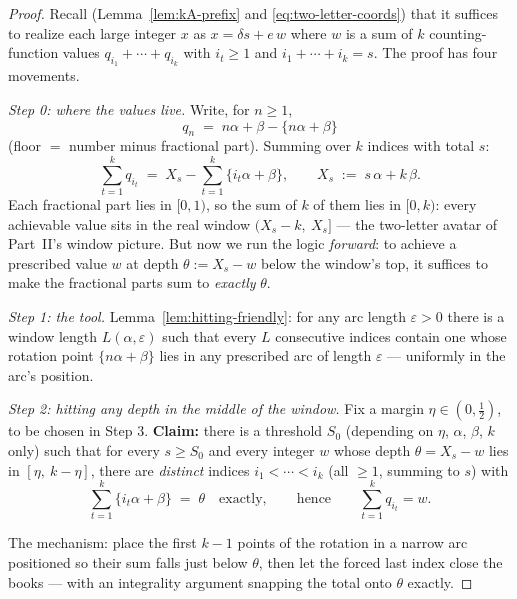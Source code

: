 \documentclass[11pt,reqno]{amsart}
\theoremstyle{plain}
\theoremstyle{definition}
\theoremstyle{remark}
\begin{document}
\begin{proof}
Recall (Lemma~\ref{lem:kA-prefix} and \eqref{eq:two-letter-coords}) that it
suffices to realize each large integer $x$ as $x = \delta s + e\,w$ where $w$ is a
sum of $k$ counting-function values $q_{i_1} + \cdots + q_{i_k}$ with $i_t \ge 1$
and $i_1 + \cdots + i_k = s$. The proof has four movements.

\smallskip
\emph{Step 0: where the values live.} Write, for $n \ge 1$,
\[
  q_n \;=\; n\alpha + \beta - \{n\alpha + \beta\}
\]
(floor $=$ number minus fractional part). Summing over $k$ indices with total $s$:
\begin{equation}\label{eq:Xs}
  \sum_{t=1}^{k} q_{i_t} \;=\; X_s - \sum_{t=1}^{k} \{i_t \alpha + \beta\},
  \qquad X_s \;:=\; s\,\alpha + k\,\beta .
\end{equation}
Each fractional part lies in $[0,1)$, so the sum of $k$ of them lies in $[0, k)$:
every achievable value sits in the real window $(X_s - k,\ X_s]$ --- the two-letter
avatar of Part~II's window picture. But now we run the logic \emph{forward}: to
achieve a prescribed value $w$ at depth $\theta := X_s - w$ below the window's top,
it suffices to make the fractional parts sum to \emph{exactly} $\theta$.

\smallskip
\emph{Step 1: the tool.} Lemma~\ref{lem:hitting-friendly}: for any arc length
$\varepsilon > 0$ there is a window length $L(\alpha, \varepsilon)$ such that every
$L$ consecutive indices contain one whose rotation point $\{n\alpha + \beta\}$ lies
in any prescribed arc of length $\varepsilon$ --- uniformly in the arc's position.

\smallskip
\emph{Step 2: hitting any depth in the middle of the window.} Fix a margin $\eta
\in (0, \tfrac12)$, to be chosen in Step 3. \textbf{Claim:} there is a threshold
$S_0$ (depending on $\eta$, $\alpha$, $\beta$, $k$ only) such that for every $s \ge
S_0$ and every integer $w$ whose depth $\theta = X_s - w$ lies in $[\eta,\ k -
\eta]$, there are \emph{distinct} indices $i_1 < \cdots < i_k$ (all $\ge 1$, summing
to $s$) with
\[
  \sum_{t=1}^{k} \{ i_t \alpha + \beta \} \;=\; \theta \quad\text{exactly},
  \qquad\text{hence}\qquad \sum_{t=1}^{k} q_{i_t} = w .
\]

The mechanism: place the first $k-1$ points of the rotation in a narrow arc
positioned so their sum falls just below $\theta$, then let the forced last index
close the books --- with an integrality argument snapping the total onto $\theta$
exactly.


\end{proof}
\end{document}
